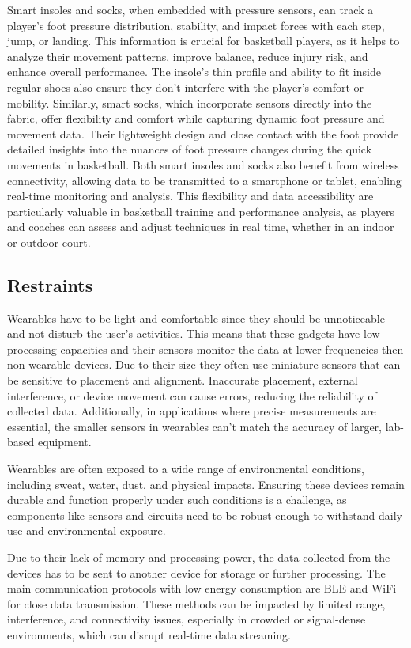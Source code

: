 Smart insoles and socks, when embedded with pressure sensors, can track a player's foot pressure distribution, stability, and impact forces with each step, jump, or landing. This information 
is crucial for basketball players, as it helps to analyze their movement patterns, improve balance, reduce injury risk, and enhance overall performance. The insole's thin profile and 
ability to fit inside regular shoes also ensure they don't interfere with the player's comfort or mobility.
Similarly, smart socks, which incorporate sensors directly into the fabric, offer flexibility and comfort while capturing dynamic foot pressure and movement data. Their lightweight 
design and close contact with the foot provide detailed insights into the nuances of foot pressure changes during the quick movements in basketball.
Both smart insoles and socks also benefit from wireless connectivity, allowing data to be transmitted to a smartphone or tablet, enabling real-time monitoring and analysis. This 
flexibility and data accessibility are particularly valuable in basketball training and performance analysis, as players and coaches can assess and adjust techniques in real time, 
whether in an indoor or outdoor court.

\subsection{Restraints}
\label{ssec:restraints}

Wearables have to be light and comfortable since they should be unnoticeable and not disturb the user's activities. This means that these gadgets have low processing capacities 
and their sensors monitor the data at lower frequencies then non wearable devices. Due to their size they often use miniature sensors that can be sensitive to placement and alignment. 
Inaccurate placement, external interference, or device movement can cause errors, reducing the reliability of collected data. Additionally, in applications where precise measurements 
are essential, the smaller sensors in wearables can't match the accuracy of larger, lab-based equipment.

Wearables are often exposed to a wide range of environmental conditions, including sweat, water, dust, and physical impacts. Ensuring these devices remain durable and function properly 
under such conditions is a challenge, as components like sensors and circuits need to be robust enough to withstand daily use and environmental exposure.

Due to their lack of memory and processing power, the data collected from the devices has to be sent to another device for storage or further processing. The main communication protocols 
with low energy consumption are \gls{BLE} and WiFi for close data transmission. These methods can be impacted by limited range, interference, and connectivity issues, 
especially in crowded or signal-dense environments, which can disrupt real-time data streaming.

